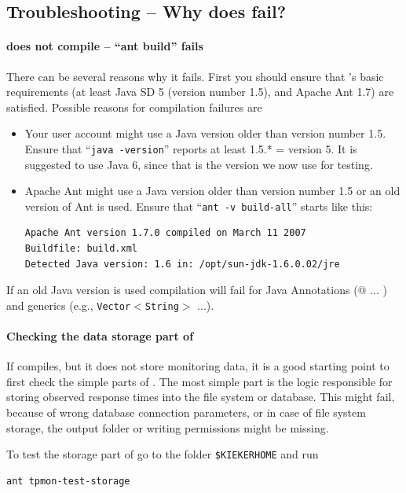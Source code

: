 \documentclass[a4paper,12pt]{scrartcl}
\begin{document}
\subsection{Troubleshooting -- Why does \tpmon{} fail?}
\paragraph{\tpmon{} does not compile -- ``ant build'' fails} There can be several reasons why it fails. First you should ensure that
\tpmon{}'s basic requirements (at least Java SD 5 (version number 1.5), and Apache Ant 1.7) are satisfied. Possible reasons for compilation failures are
\begin{itemize}
 \item Your user account might use a Java version older than version number 1.5. Ensure that ``\texttt{java -version}'' reports at least 1.5.*  = version 5. It is suggested to use Java 6, since that is the version we now use for testing.
\item Apache Ant might use a Java version older than version number 1.5 or an old version of Ant is used. Ensure that ``\texttt{ant -v build-all}'' starts like this: \begin{lstlisting}[]
Apache Ant version 1.7.0 compiled on March 11 2007
Buildfile: build.xml
Detected Java version: 1.6 in: /opt/sun-jdk-1.6.0.02/jre
\end{lstlisting}
\end{itemize}

If an old Java version is used compilation will fail for Java Annotations (@ ... ) and generics (e.g., \texttt{Vector$<$String$>$} ...).


\paragraph{Checking the data storage part of \tpmon{}}
If \tpmon{} compiles, but it does not store monitoring data, it is a good starting point to first check the simple parts of \tpmon{}. The most simple part is the logic responsible for storing observed response times into the file system or database. This might fail, because of wrong database connection parameters, or in case of file system storage, the output folder or writing permissions might be missing.

To test the storage part of \tpmon{} go to the folder \texttt{\$KIEKERHOME} and run
\begin{lstlisting}[caption={Testing the storage functionality},label={lst3}]
ant tpmon-test-storage
\end{lstlisting}
\end{document}
